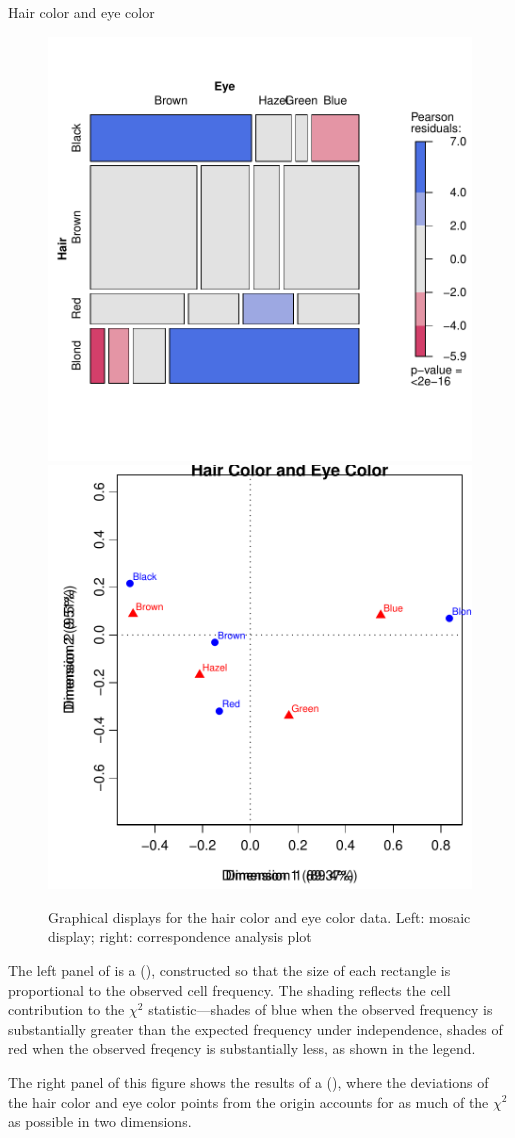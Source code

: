\documentclass[11pt]{book}\usepackage[]{graphicx}\usepackage[]{color}
\newenvironment{knitrout}{}{} %
\renewenvironment{knitrout}{\small\renewcommand{\baselinestretch}{.85}}{} %
\begin{document}
\begin{Example}[haireye0]{Hair color and eye color}
\begin{knitrout}
\color{fgcolor}\begin{figure}[htbp]


\centerline{\includegraphics[width=.49\textwidth]{ch01/fig/haireye021} 
\includegraphics[width=.49\textwidth]{ch01/fig/haireye022} }

\caption[Graphical displays for the hair color and eye color data]{Graphical displays for the hair color and eye color data. Left: mosaic display; right: correspondence analysis plot\label{fig:haireye02}}
\end{figure}


\end{knitrout}

The left panel of  is a 
(), constructed so that the size of each rectangle
is proportional to the observed cell frequency. The shading
reflects the cell contribution to the \(\chi^2\) statistic---shades of blue
when the observed frequency is substantially greater than the 
expected frequency under independence, shades of red when the observed freqency
is substantially less, as shown in the legend.

The right panel of this figure shows the results of 
a \ca (), where the deviations of the hair color and eye
color points from the origin accounts for as much of the \(\chi^2\)
as possible in two dimensions.


\end{Example}
\end{document}

